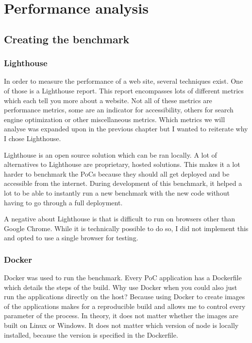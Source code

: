 \chapter{Performance analysis}

\label{Chapter4} 

\section{Creating the benchmark}

\subsection{Lighthouse}

In order to measure the performance of a web site, several techniques exist. One of those is a Lighthouse report. 
This report encompasses lots of different metrics which each tell you more about a website. 
Not all of these metrics are performance metrics, some are an indicator for accessibility, others for search engine optimization or other miscellaneous metrics.
Which metrics we will analyse was expanded upon in the previous chapter but I wanted to reiterate why I chose Lighthouse.

Lighthouse is an open source solution which can be ran locally. 
A lot of alternatives to Lighthouse are proprietary, hosted solutions. 
This makes it a lot harder to benchmark the PoCs because they should all get deployed and be accessible from the internet. 
During development of this benchmark, it helped a lot to be able to instantly run a new benchmark with the new code without having to go through a full deployment.

A negative about Lighthouse is that is difficult to run on browsers other than Google Chrome. While it is technically possible to do so, I did not implement this and opted to use a single browser for testing.

\subsection{Docker}

Docker was used to run the benchmark. Every PoC application has a Dockerfile which details the steps of the build. 
Why use Docker when you could also just run the applications directly on the host?
Because using Docker to create images of the applications makes for a reproducible build and allows me to control every parameter of the process.
In theory, it does not matter whether the images are built on Linux or Windows. 
It does not matter which version of node is locally installed, because the version is specified in the Dockerfile.

